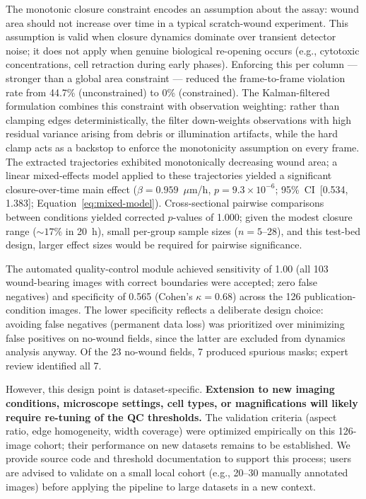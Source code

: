 The monotonic closure constraint encodes an assumption about the assay: wound area should not increase over time in a typical scratch-wound experiment. This assumption is valid when closure dynamics dominate over transient detector noise; it does not apply when genuine biological re-opening occurs (e.g., cytotoxic concentrations, cell retraction during early phases). Enforcing this per column — stronger than a global area constraint — reduced the frame-to-frame violation rate from 44.7\% (unconstrained) to 0\% (constrained). The Kalman-filtered formulation combines this constraint with observation weighting: rather than clamping edges deterministically, the filter down-weights observations with high residual variance arising from debris or illumination artifacts, while the hard clamp acts as a backstop to enforce the monotonicity assumption on every frame. The extracted trajectories exhibited monotonically decreasing wound area; a linear mixed-effects model applied to these trajectories yielded a significant closure-over-time main effect ($\beta = 0.959$~$\mu$m/h, $p = 9.3 \times 10^{-6}$; 95\%~CI~[0.534, 1.383]; Equation~\eqref{eq:mixed-model}). Cross-sectional pairwise comparisons between conditions yielded corrected $p$-values of 1.000; given the modest closure range (${\sim}17\%$ in 20~h), small per-group sample sizes ($n = 5$--28), and this test-bed design, larger effect sizes would be required for pairwise significance.

The automated quality-control module achieved sensitivity of 1.00 (all 103 wound-bearing images with correct boundaries were accepted; zero false negatives) and specificity of 0.565 (Cohen's $\kappa = 0.68$) across the 126 publication-condition images. The lower specificity reflects a deliberate design choice: avoiding false negatives (permanent data loss) was prioritized over minimizing false positives on no-wound fields, since the latter are excluded from dynamics analysis anyway. Of the 23 no-wound fields, 7 produced spurious masks; expert review identified all 7.

However, this design point is dataset-specific. \textbf{Extension to new imaging conditions, microscope settings, cell types, or magnifications will likely require re-tuning of the QC thresholds.} The validation criteria (aspect ratio, edge homogeneity, width coverage) were optimized empirically on this 126-image cohort; their performance on new datasets remains to be established. We provide source code and threshold documentation to support this process; users are advised to validate on a small local cohort (e.g., 20--30 manually annotated images) before applying the pipeline to large datasets in a new context.

